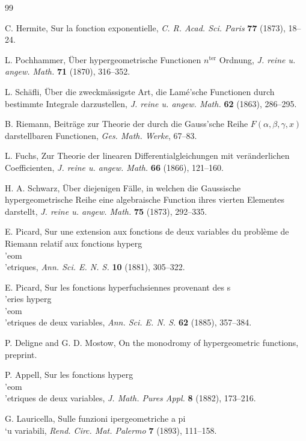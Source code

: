 \documentclass[12pt,a4paper]{article}
\theoremstyle{plain}
\theoremstyle{definition}
\theoremstyle{remark}
\numberwithin{equation}{section}
\begin{document}
\begin{thebibliography}{99}

C. Hermite, Sur la fonction exponentielle, \textit{C. R. Acad. Sci. Paris} \textbf{77} (1873), 18--24.

L. Pochhammer, \"Uber hypergeometrische Functionen $n^{\text{ter}}$ Ordnung, \textit{J. reine u. angew. Math.} \textbf{71} (1870), 316--352.

L. Sch\"afli, \"Uber die zweckm\"assigste Art, die Lam\'e'sche Functionen durch bestimmte Integrale darzustellen, \textit{J. reine u. angew. Math.} \textbf{62} (1863), 286--295.

B. Riemann, Beitr\"age zur Theorie der durch die Gauss'sche Reihe $F(\alpha, \beta, \gamma, x)$ darstellbaren Functionen, \textit{Ges. Math. Werke}, 67--83.

L. Fuchs, Zur Theorie der linearen Differentialgleichungen mit ver\"anderlichen Coefficienten, \textit{J. reine u. angew. Math.} \textbf{66} (1866), 121--160.

H. A. Schwarz, \"Uber diejenigen F\"alle, in welchen die Gaussische hypergeometrische Reihe eine algebraische Function ihres vierten Elementes darstellt, \textit{J. reine u. angew. Math.} \textbf{75} (1873), 292--335.

E. Picard, Sur une extension aux fonctions de deux variables du probl\`eme de Riemann relatif aux fonctions hyperg\\'eom\\'etriques, \textit{Ann. Sci. E. N. S.} \textbf{10} (1881), 305--322.

E. Picard, Sur les fonctions hyperfuchsiennes provenant des s\\'eries hyperg\\'eom\\'etriques de deux variables, \textit{Ann. Sci. E. N. S.} \textbf{62} (1885), 357--384.

P. Deligne and G. D. Mostow, On the monodromy of hypergeometric functions, preprint.

P. Appell, Sur les fonctions hyperg\\'eom\\'etriques de deux variables, \textit{J. Math. Pures Appl.} \textbf{8} (1882), 173--216.

G. Lauricella, Sulle funzioni ipergeometriche a pi\\`u variabili, \textit{Rend. Circ. Mat. Palermo} \textbf{7} (1893), 111--158.


\end{thebibliography}
\end{document}
